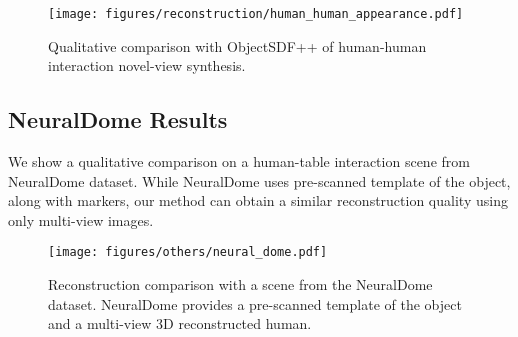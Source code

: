 \begin{table}
\label{table:human_human_appearance}
\vspace{-1em}
\caption{Quantitative comparison of our method with the ObjectSDF++ on the novel-view synthesis task of the Human-Human scenes.}
\end{table}

\begin{figure*}[h]
    \vspace{-20pt}
    \texttt{[image: figures/reconstruction/human\_human\_appearance.pdf]}
    \caption{Qualitative comparison with ObjectSDF++ of human-human interaction novel-view synthesis.}
    \label{fig:human_human_appearance}
\end{figure*}

\subsection{NeuralDome Results}
We show a qualitative comparison on a human-table interaction scene from NeuralDome \cite{zhang2023neuraldome} dataset. While NeuralDome uses pre-scanned template of the object, along with markers, our method can obtain a similar reconstruction quality using only multi-view images.
\begin{figure}
    \centering
    \texttt{[image: figures/others/neural\_dome.pdf]}
    \caption{Reconstruction comparison with a scene from the NeuralDome dataset. NeuralDome provides a pre-scanned template of the object and a multi-view 3D reconstructed human.} 
    \label{fig:neural_dome_table}
\end{figure}

